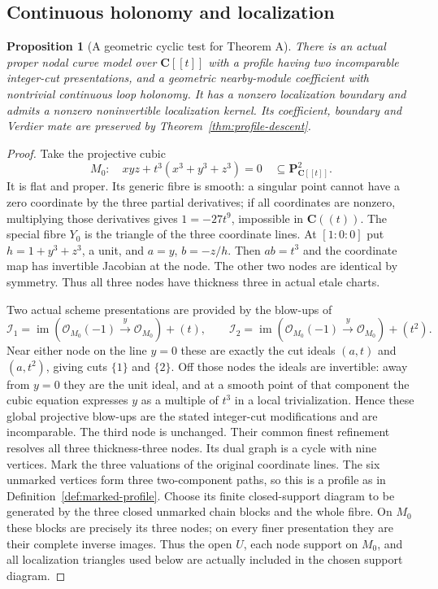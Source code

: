 \documentclass[11pt]{article}
\newtheorem{proposition}[theorem]{Proposition}
\theoremstyle{definition}
\theoremstyle{remark}
\begin{document}
\subsection{Continuous holonomy and localization}
\begin{proposition}[A geometric cyclic test for Theorem A]
\label{prop:actual-loop}
There is an actual proper nodal curve model over $\mathbf C[[t]]$
with a profile having two incomparable integer-cut presentations,
and a geometric nearby-module coefficient with nontrivial continuous
loop holonomy.  It has a nonzero localization boundary and admits
a nonzero noninvertible localization kernel.  Its coefficient,
boundary and Verdier mate are preserved by Theorem~\ref{thm:profile-descent}.
\end{proposition}
\begin{proof}
Take the projective cubic
\[
 M_0:\quad xyz+t^3(x^3+y^3+z^3)=0
 \quad\subseteq\mathbf P^2_{\mathbf C[[t]]}.
\]
It is flat and proper.  Its generic fibre is smooth: a singular point
cannot have a zero coordinate by the three partial derivatives;
if all coordinates are nonzero, multiplying those derivatives gives
$1=-27t^9$, impossible in $\mathbf C((t))$.  The special fibre
$Y_0$ is the triangle of the three coordinate lines.  At $[1:0:0]$
put $h=1+y^3+z^3$, a unit, and $a=y$, $b=-z/h$.
Then $ab=t^3$ and the coordinate map has invertible Jacobian at
the node.  The other two nodes are identical by symmetry.
Thus all three nodes have thickness three in actual etale charts.

Two actual scheme presentations are provided by the blow-ups of
\[
 \mathcal I_1=\operatorname{im}(\mathcal O_{M_0}(-1)
       \xrightarrow{y}\mathcal O_{M_0})+(t),\qquad
 \mathcal I_2=\operatorname{im}(\mathcal O_{M_0}(-1)
       \xrightarrow{y}\mathcal O_{M_0})+(t^2).
\]
Near either node on the line $y=0$ these are exactly the cut ideals
$(a,t)$ and $(a,t^2)$, giving cuts $\{1\}$ and $\{2\}$.
Off those nodes the ideals are invertible: away from $y=0$ they
are the unit ideal, and at a smooth point of that component the
cubic equation expresses $y$ as a multiple of $t^3$ in a local
trivialization.  Hence these global projective blow-ups are the
stated integer-cut modifications and are incomparable.  The third
node is unchanged.  Their common finest refinement resolves all
three thickness-three nodes.  Its dual graph is a cycle with nine
vertices.  Mark the three valuations of the original coordinate
lines.  The six unmarked vertices form three two-component paths,
so this is a profile as in Definition~\ref{def:marked-profile}.
Choose its finite closed-support diagram to be generated by the
three closed unmarked chain blocks and the whole fibre. On $M_0$
these blocks are precisely its three nodes; on every finer
presentation they are their complete inverse images. Thus the
open $U$, each node support on $M_0$, and all localization triangles
used below are actually included in the chosen support diagram.


\end{proof}
\end{document}
